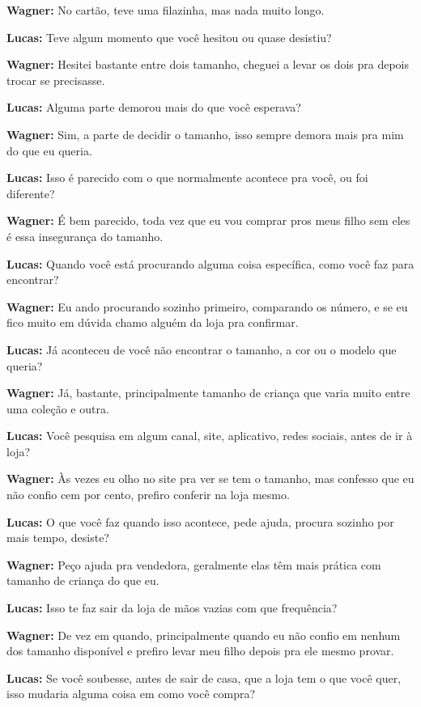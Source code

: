 \textbf{Wagner:} No cartão, teve uma filazinha, mas nada muito longo.

\textbf{Lucas:} Teve algum momento que você hesitou ou quase desistiu?

\textbf{Wagner:} Hesitei bastante entre dois tamanho, cheguei a levar os dois pra depois trocar se precisasse.

\textbf{Lucas:} Alguma parte demorou mais do que você esperava?

\textbf{Wagner:} Sim, a parte de decidir o tamanho, isso sempre demora mais pra mim do que eu queria.

\textbf{Lucas:} Isso é parecido com o que normalmente acontece pra você, ou foi diferente?

\textbf{Wagner:} É bem parecido, toda vez que eu vou comprar pros meus filho sem eles é essa insegurança do tamanho.

\textbf{Lucas:} Quando você está procurando alguma coisa específica, como você faz para encontrar?

\textbf{Wagner:} Eu ando procurando sozinho primeiro, comparando os número, e se eu fico muito em dúvida chamo alguém da loja pra confirmar.

\textbf{Lucas:} Já aconteceu de você não encontrar o tamanho, a cor ou o modelo que queria?

\textbf{Wagner:} Já, bastante, principalmente tamanho de criança que varia muito entre uma coleção e outra.

\textbf{Lucas:} Você pesquisa em algum canal, site, aplicativo, redes sociais, antes de ir à loja?

\textbf{Wagner:} Às vezes eu olho no site pra ver se tem o tamanho, mas confesso que eu não confio cem por cento, prefiro conferir na loja mesmo.

\textbf{Lucas:} O que você faz quando isso acontece, pede ajuda, procura sozinho por mais tempo, desiste?

\textbf{Wagner:} Peço ajuda pra vendedora, geralmente elas têm mais prática com tamanho de criança do que eu.

\textbf{Lucas:} Isso te faz sair da loja de mãos vazias com que frequência?

\textbf{Wagner:} De vez em quando, principalmente quando eu não confio em nenhum dos tamanho disponível e prefiro levar meu filho depois pra ele mesmo provar.

\textbf{Lucas:} Se você soubesse, antes de sair de casa, que a loja tem o que você quer, isso mudaria alguma coisa em como você compra?

